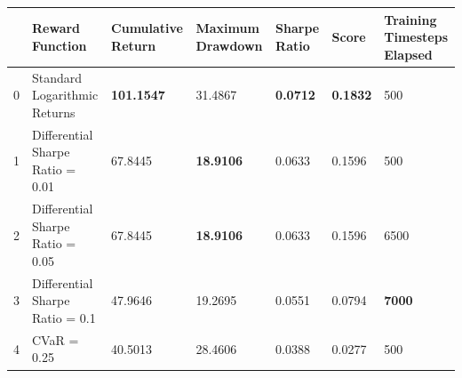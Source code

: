 \begin{tabular}{lllllll}
\toprule
 & Reward Function & Cumulative Return & Maximum Drawdown & Sharpe Ratio & Score & Training Timesteps Elapsed \\
\midrule
0 & Standard Logarithmic Returns & \textbf{101.1547} & 31.4867 & \textbf{0.0712} & \textbf{0.1832} & 500 \\
1 & Differential Sharpe Ratio = 0.01 & 67.8445 & \textbf{18.9106} & 0.0633 & 0.1596 & 500 \\
2 & Differential Sharpe Ratio = 0.05 & 67.8445 & \textbf{18.9106} & 0.0633 & 0.1596 & 6500 \\
3 & Differential Sharpe Ratio = 0.1 & 47.9646 & 19.2695 & 0.0551 & 0.0794 & \textbf{7000} \\
4 & CVaR = 0.25 & 40.5013 & 28.4606 & 0.0388 & 0.0277 & 500 \\
\bottomrule
\end{tabular}
